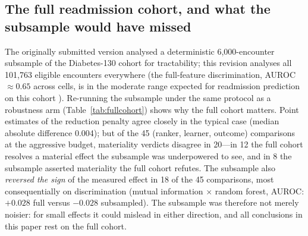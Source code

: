 \documentclass[fleqn,10pt]{wlscirep}
\newcommand{\result}[1]{#1}
\begin{document}
\begin{table}[t]
\centering
\caption{The recalibrator flexibility ladder at the full budget, over twelve datasets, three rankers
and three learners (\result{108} cells at every rung). Recovery is signed so that positive means
improvement over the uncalibrated model. Calibration-error recovery rises strictly with flexibility;
selective-reliability recovery does not, and is negative at most rungs. Net-benefit recovery rises
monotonically but is an order of magnitude smaller, as the final row shows.}
\label{tab:ladder}

\end{table}

\begin{table}[t]
\centering
\caption{Raw versus leakage-safe Platt- and isotonic-recalibrated reduction penalty at 25\,\% of
features (mean paired difference vs.\ full over the twelve datasets, \emph{all three rankers}, and
three learners---108 cells; positive ECE/Brier/AURC values indicate degradation, as do negative
AUROC/net-benefit values), with
the count of materially worse cells. Recalibration recovers the (learner-specific) calibration-error
penalty but not the AURC, Brier, or net-benefit loss, and isotonic does no better than Platt.
The pooled ECE row is dominated by the learners with little or no raw penalty to recover; the
recovery is visible in the random forest, reported in the text.
Computed from the released all-rankers recalibration-control summary.}
\label{tab:recal}

\end{table}

\subsection{The full readmission cohort, and what the subsample would have missed}
\label{sec:fullcohort}
The originally submitted version analysed a deterministic \result{6{,}000}-encounter subsample of the
Diabetes-130 cohort for tractability; this revision analyses all \result{101{,}763} eligible
encounters everywhere (the full-feature discrimination, AUROC $\approx\result{0.65}$ across cells, is
in the moderate range expected for readmission prediction on this cohort \cite{strack2014impact}).
Re-running the subsample under the same protocol as a robustness arm
(Table~\ref{tab:fullcohort}) shows why the full cohort matters. Point estimates of the reduction
penalty agree closely in the typical case (median absolute difference \result{0.004}); but of the
\result{45} (ranker, learner, outcome) comparisons at the aggressive budget, materiality verdicts
disagree in \result{20}---in \result{12} the full cohort resolves a material effect the subsample was
underpowered to see, and in \result{8} the subsample asserted materiality the full cohort refutes.
The subsample also \emph{reversed the sign} of the measured effect in \result{18} of the
\result{45} comparisons, most consequentially on discrimination (mutual information $\times$
random forest, AUROC: \result{$+0.028$} full versus \result{$-0.028$} subsampled). The subsample was
therefore not merely noisier: for small effects it could mislead in either direction, and all
conclusions in this paper rest on the full cohort.
\end{document}
